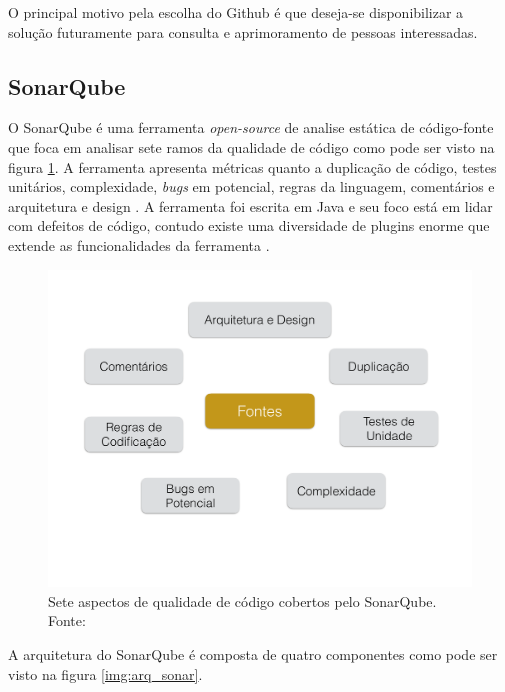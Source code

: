 	 O principal motivo pela escolha do Github é que deseja-se disponibilizar a solução futuramente para consulta e aprimoramento de pessoas interessadas. 		

	\subsection{SonarQube}
	\label{sub:sonarqube}
	O SonarQube é uma ferramenta \textit{open-source} de analise estática de código-fonte que foca em analisar sete ramos da qualidade de código como pode ser visto na figura \ref{img:sonar}. A ferramenta apresenta métricas quanto a duplicação de código, testes unitários, complexidade, \textit{bugs} em potencial, regras da linguagem, comentários e arquitetura e design \cite{sonar}. A ferramenta foi escrita em Java e seu foco está em lidar com defeitos de código, contudo existe uma diversidade de plugins enorme que extende as funcionalidades da ferramenta \cite{ferenc_source_2014}.
\graphicspath{{figuras/}}
\begin{figure}[h]
\centering
\includegraphics[scale=0.5]{Sonar}
\caption{Sete  aspectos de qualidade de código cobertos pelo SonarQube. Fonte: \cite{sonar}}
\label{img:sonar}
\end{figure}
A arquitetura do SonarQube é composta de quatro componentes como pode ser visto na figura \ref{img:arq_sonar}\cite{sonar}.
